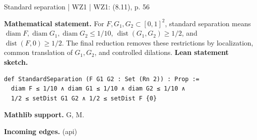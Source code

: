 \documentclass[10pt,a4paper]{article}
\newcommand{\nodecard}[1]{\hyperlink{node-#1}{\texttt{\detokenize{#1}}}}
\begin{document}
\begin{minipage}{\linewidth}
\hypertarget{node-Dsep}{}
\begin{tcolorbox}[colback=white,colframe=radialfg,colbacktitle=radialbg,coltitle=ink,boxrule=0.45pt,arc=1.6mm,left=3mm,right=3mm,top=2mm,bottom=2mm,title={\sffamily\bfseries WZ1 Definition 8.6 \hfill \texttt{Dsep}}]
{\sffamily\small\color{muted}Standard separation | WZ1 | WZ1: (8.11), p. 56}\par
\textbf{Mathematical statement.} For $F,G_1,G_2\subset[0,1]^2$, standard separation means
$\operatorname{diam}F,\operatorname{diam}G_1,\operatorname{diam}G_2\le1/10$,
$\operatorname{dist}(G_1,G_2)\ge1/2$, and $\operatorname{dist}(F,0)\ge1/2$.
The final reduction removes these restrictions by localization, common translation of $G_1,G_2$, and controlled dilations.
\smallskip\textbf{Lean statement sketch.}
\begin{Verbatim}[fontsize=\small,breaklines=true,breakanywhere=true,tabsize=2]
def StandardSeparation (F G1 G2 : Set (Rn 2)) : Prop :=
  diam F ≤ 1/10 ∧ diam G1 ≤ 1/10 ∧ diam G2 ≤ 1/10 ∧
  1/2 ≤ setDist G1 G2 ∧ 1/2 ≤ setDist F {0}
\end{Verbatim}
{\footnotesize\textbf{Mathlib support.} G, M.\par
\textbf{Incoming edges.} \nodecard{Igeom} (api)\par}

\end{tcolorbox}\end{minipage}\par\medskip
\end{document}
